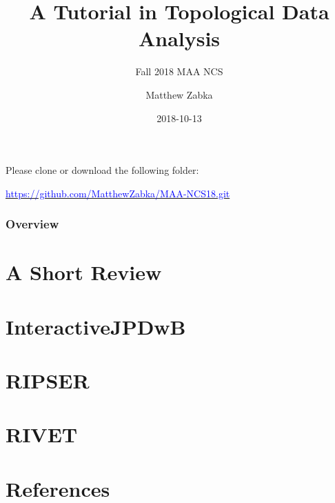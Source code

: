 \documentclass[handout]{beamer}
\title{A Tutorial in Topological Data Analysis} %
\subtitle{Fall 2018 MAA NCS}
\author{Matthew Zabka}
\institute[SMSU]{Mathematics and Computer Science \\ Southwest Minnesota State University} %
{
}
\date{2018-10-13} %
\begin{document}
\begin{frame}
\titlepage %
\begin{center}
Please clone or download the following folder:
\end{center}
\begin{center}
\hyperref[https://github.com/MatthewZabka/MAA-NCS18.git]{\textcolor{blue}{https://github.com/MatthewZabka/MAA-NCS18.git}}
\end{center}
\end{frame}
\begin{frame}
\frametitle{Overview} %
\tableofcontents 
\end{frame}
\section{A Short Review}
%
\section{InteractiveJPDwB}
%
\section{RIPSER}
%
\section{RIVET}

\section{References}
\begin{frame}


\end{frame}
\end{document}
